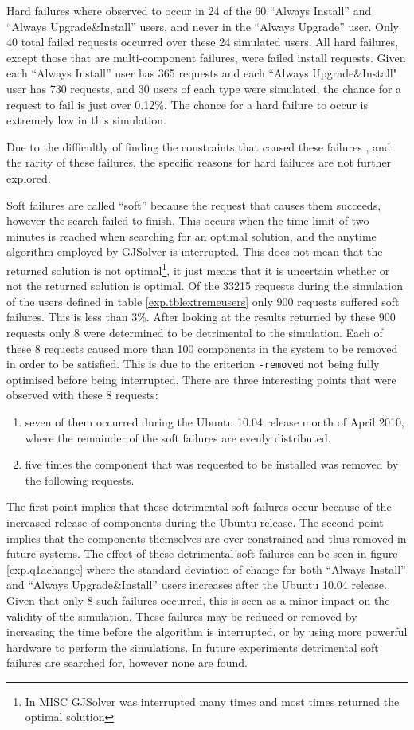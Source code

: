Hard failures where observed to occur in 24 of the 60 ``Always Install'' and ``Always Upgrade\&Install'' users, and never in the ``Always Upgrade'' user.
Only 40 total failed requests occurred over these 24 simulated users.
All hard failures, except those that are multi-component failures, were failed install requests.
Given each ``Always Install'' user has 365 requests and each ``Always Upgrade\&Install" user has 730 requests, 
and 30 users of each type were simulated, the chance for a request to fail is just over 0.12\%.
The chance for a hard failure to occur is extremely low in this simulation.

Due to the difficultly of finding the constraints that caused these failures \citep{quickxplain},
and the rarity of these failures, the specific reasons for hard failures are not further explored.

Soft failures are called ``soft'' because the request that causes them succeeds, however the search failed to finish.
This occurs when the time-limit of two minutes is reached when searching for an optimal solution, and the anytime algorithm employed by GJSolver is interrupted.
This does not mean that the returned solution is not optimal\footnote{In MISC GJSolver was interrupted many times and most times returned the optimal solution},
it just means that it is uncertain whether or not the returned solution is optimal.
Of the 33215 requests during the simulation of the users defined in table \ref{exp.tblextremeusers} only 900 requests suffered soft failures.
This is less than 3\%.
After looking at the results returned by these 900 requests only 8 were determined to be detrimental to the simulation.
Each of these 8 requests caused more than 100 components in the system to be removed in order to be satisfied.
This is due to the criterion \texttt{-removed} not being fully optimised before being interrupted.
There are three interesting points that were observed with these 8 requests:
\begin{enumerate}
  \item seven of them occurred during the Ubuntu 10.04 release month of April 2010, where the remainder of the soft failures are evenly distributed.
  \item five times the component that was requested to be installed was removed by the following requests.
\end{enumerate}
The first point implies that these detrimental soft-failures occur because of the increased release of components during the Ubuntu release.
The second point implies that the components themselves are over constrained and thus removed in future systems.
The effect of these detrimental soft failures can be seen in figure \ref{exp.q1achange} 
where the standard deviation of change for both ``Always Install'' and ``Always Upgrade\&Install'' users increases after the Ubuntu 10.04 release.
Given that only 8 such failures occurred, this is seen as a minor impact on the validity of the simulation.
These failures may be reduced or removed by increasing the time before the algorithm is interrupted, or by using more powerful hardware to perform the simulations.
In future experiments detrimental soft failures are searched for, however none are found.


